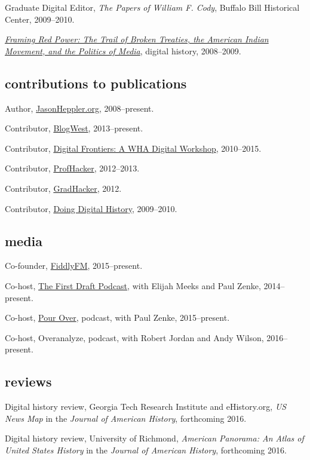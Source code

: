 Graduate Digital Editor, \emph{The Papers of William F. Cody}, Buffalo
Bill Historical Center, 2009--2010.

\emph{\href{http://framingredpower.org}{Framing Red Power: The Trail of
Broken Treaties, the American Indian Movement, and the Politics of
Media}}, digital history, 2008--2009.

\subsection{contributions to
publications}\label{contributions-to-publications}

Author, \href{http://jasonheppler.org}{JasonHeppler.org}, 2008--present.

Contributor, \href{http://blogwest.org/}{BlogWest}, 2013--present.

Contributor, \href{http://whadigitalfrontiers.com/}{Digital Frontiers: A
WHA Digital Workshop}, 2010--2015.

Contributor, \href{http://chronicle.com/blogs/profhacker/}{ProfHacker},
2012--2013.

Contributor,
\href{https://www.insidehighered.com/blogs/gradhacker}{GradHacker},
2012.

Contributor, \href{http://digitalhistory.unl.edu/}{Doing Digital
History}, 2009--2010.

\subsection{media}\label{media}

Co-founder, \href{http://fiddly.fm}{FiddlyFM}, 2015--present.

Co-host, \href{http://www.fiddly.fm/firstdraft/}{The First Draft
Podcast}, with Elijah Meeks and Paul Zenke, 2014--present.

Co-host, \href{http://www.fiddly.fm/pourover/}{Pour Over}, podcast, with
Paul Zenke, 2015--present.

Co-host, Overanalyze, podcast, with Robert Jordan and Andy Wilson,
2016--present.

\subsection{reviews}\label{reviews}

Digital history review, Georgia Tech Research Institute and
eHistory.org, \emph{US News Map} in the \emph{Journal of American
History}, forthcoming 2016.

Digital history review, University of Richmond, \emph{American Panorama:
An Atlas of United States History} in the \emph{Journal of American
History}, forthcoming 2016.

